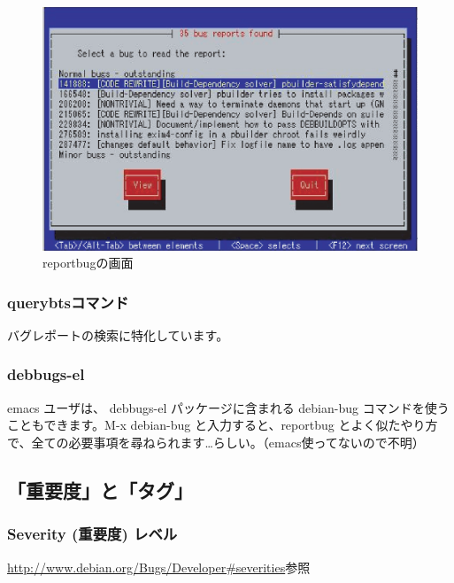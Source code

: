 \documentclass[mingoth,a4paper]{jsarticle}
\begin{document}
\begin{figure}[htbp]
\begin{center}
\includegraphics{image200508/reportbug.eps}
\end{center}
\caption{reportbugの画面}
\label{reportbug}
\end{figure}

\subsubsection*{querybtsコマンド}

バグレポートの検索に特化しています。

\subsubsection{debbugs-el}

emacs ユーザは、 debbugs-el パッケージに含まれる debian-bug コマンドを使うこともできます。M-x debian-bug と入力すると、reportbug とよく似たやり方で、全ての必要事項を尋ねられます…らしい。（emacs使ってないので不明）

\subsection{「重要度」と「タグ」}

\subsubsection{Severity (重要度) レベル}

\url{http://www.debian.org/Bugs/Developer#severities}参照
\end{document}
